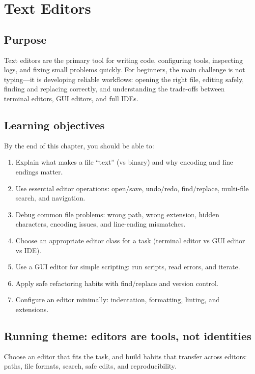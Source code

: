 \chapter{Text Editors}
\label{ch:text-editors}

\section*{Purpose}
Text editors are the primary tool for writing code, configuring tools, inspecting logs, and fixing small problems quickly. For beginners, the main challenge is not typing---it is developing reliable workflows: opening the right file, editing safely, finding and replacing correctly, and understanding the trade-offs between terminal editors, GUI editors, and full IDEs.

\section*{Learning objectives}
By the end of this chapter, you should be able to:
\begin{enumerate}
\item Explain what makes a file ``text'' (vs binary) and why encoding and line endings matter.
\item Use essential editor operations: open/save, undo/redo, find/replace, multi-file search, and navigation.
\item Debug common file problems: wrong path, wrong extension, hidden characters, encoding issues, and line-ending mismatches.
\item Choose an appropriate editor class for a task (terminal editor vs GUI editor vs IDE).
\item Use a GUI editor for simple scripting: run scripts, read errors, and iterate.
\item Apply safe refactoring habits with find/replace and version control.
\item Configure an editor minimally: indentation, formatting, linting, and extensions.
\end{enumerate}

\section*{Running theme: editors are tools, not identities}
Choose an editor that fits the task, and build habits that transfer across editors: paths, file formats, search, safe edits, and reproducibility.

